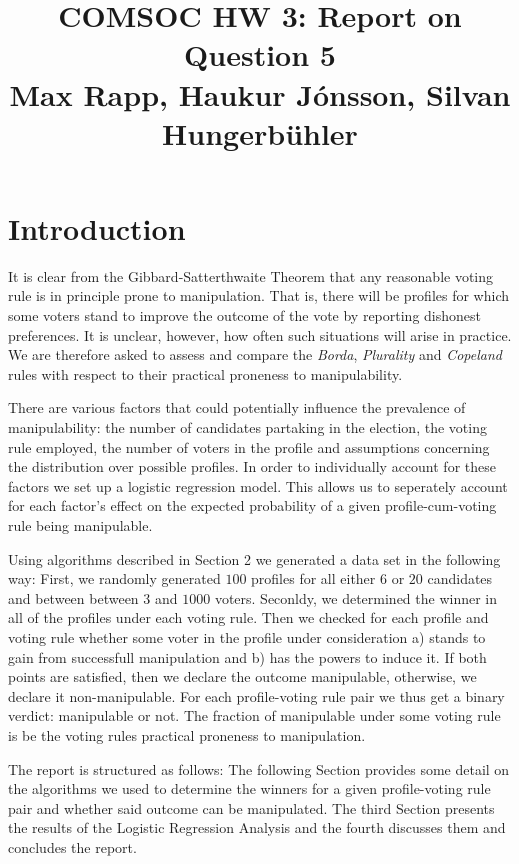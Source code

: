 \documentclass[10pt,a4paper]{article}
\title{%
  COMSOC HW 3: Report on Question 5 \\
  \large Max Rapp, Haukur J{\'o}nsson, Silvan Hungerb{\"u}hler}
\date{}
\begin{document}
\maketitle
\section{Introduction}
It is clear from the Gibbard-Satterthwaite Theorem that any reasonable voting rule is in principle prone to manipulation. That is, there will be profiles for which some voters stand to improve the outcome of the vote by reporting dishonest preferences. It is unclear, however, how often such situations will arise in practice. We are therefore asked to assess and compare the \textit{Borda}, \textit{Plurality} and \textit{Copeland} rules with respect to their practical proneness to manipulability.

There are various factors that could potentially influence the prevalence of manipulability: the number of candidates partaking in the election, the voting rule employed, the number of voters in the profile and assumptions concerning the distribution over possible profiles. In order to individually account for these factors we set up a logistic regression model. This allows us to seperately account for each factor's effect on the expected probability of a given profile-cum-voting rule being manipulable. 

Using algorithms described in Section 2 we generated a data set in the following way:
First, we randomly generated $100$ profiles for all either $6$ or $20$ candidates and between between $3$ and $1000$ voters.  Seconldy, we determined the winner in all of the profiles under each voting rule. Then we checked for each profile and voting rule whether some voter in the profile under consideration a) stands to gain from successfull manipulation and b) has the powers to induce it. If both points are satisfied, then we declare the outcome manipulable, otherwise, we declare it non-manipulable. For each profile-voting rule pair we thus get a binary verdict: manipulable or not. The fraction of manipulable under some voting rule is be the voting rules practical proneness to manipulation.

The report is structured as follows: The following Section provides some detail on the algorithms we used to determine the winners for a given profile-voting rule pair and whether said outcome can be manipulated. The third Section presents the results of the Logistic Regression Analysis and the fourth discusses them and concludes the report.
\end{document}
